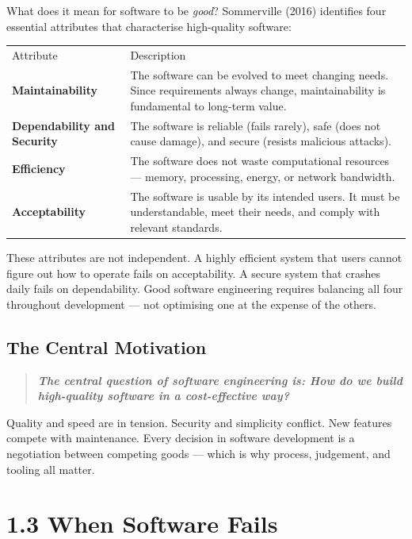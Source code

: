 \documentclass[11pt,a4paper]{book}
\begin{document}
What does it mean for software to be \textit{good}? Sommerville (2016) identifies four essential attributes that characterise high-quality software:

\begin{tabular}{ll}
\hline
Attribute & Description \\
\textbf{Maintainability} & The software can be evolved to meet changing needs. Since requirements always change, maintainability is fundamental to long-term value. \\
\textbf{Dependability and Security} & The software is reliable (fails rarely), safe (does not cause damage), and secure (resists malicious attacks). \\
\textbf{Efficiency} & The software does not waste computational resources --- memory, processing, energy, or network bandwidth. \\
\textbf{Acceptability} & The software is usable by its intended users. It must be understandable, meet their needs, and comply with relevant standards. \\
\hline
\end{tabular}

These attributes are not independent. A highly efficient system that users cannot figure out how to operate fails on acceptability. A secure system that crashes daily fails on dependability. Good software engineering requires balancing all four throughout development --- not optimising one at the expense of the others.

\subsection{The Central Motivation}

\begin{quote}
\textit{\textbf{The central question of software engineering is: How do we build high-quality software in a cost-effective way?}}
\end{quote}

Quality and speed are in tension. Security and simplicity conflict. New features compete with maintenance. Every decision in software development is a negotiation between competing goods --- which is why process, judgement, and tooling all matter.

\medskip

\section{1.3 When Software Fails}
\end{document}
